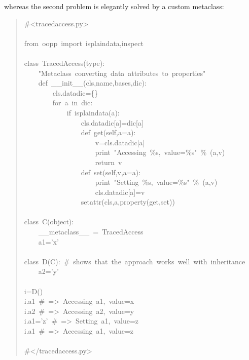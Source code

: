 \documentclass[10pt,english]{article}
\begin{document}
whereas the second problem is elegantly solved by a custom metaclass:
\begin{quote}
\begin{ttfamily}\begin{flushleft}
\mbox{{\#}<tracedaccess.py>}\\
\mbox{}\\
\mbox{from~oopp~import~isplaindata,inspect}\\
\mbox{}\\
\mbox{class~TracedAccess(type):}\\
\mbox{~~~~"Metaclass~converting~data~attributes~to~properties"}\\
\mbox{~~~~def~{\_}{\_}init{\_}{\_}(cls,name,bases,dic):}\\
\mbox{~~~~~~~~cls.datadic={\{}{\}}}\\
\mbox{~~~~~~~~for~a~in~dic:}\\
\mbox{~~~~~~~~~~~~if~isplaindata(a):}\\
\mbox{~~~~~~~~~~~~~~~~cls.datadic[a]=dic[a]}\\
\mbox{~~~~~~~~~~~~~~~~def~get(self,a=a):}\\
\mbox{~~~~~~~~~~~~~~~~~~~~v=cls.datadic[a]}\\
\mbox{~~~~~~~~~~~~~~~~~~~~print~"Accessing~{\%}s,~value={\%}s"~{\%}~(a,v)}\\
\mbox{~~~~~~~~~~~~~~~~~~~~return~v}\\
\mbox{~~~~~~~~~~~~~~~~def~set(self,v,a=a):}\\
\mbox{~~~~~~~~~~~~~~~~~~~~print~"Setting~{\%}s,~value={\%}s"~{\%}~(a,v)}\\
\mbox{~~~~~~~~~~~~~~~~~~~~cls.datadic[a]=v}\\
\mbox{~~~~~~~~~~~~~~~~setattr(cls,a,property(get,set))}\\
\mbox{}\\
\mbox{class~C(object):}\\
\mbox{~~~~{\_}{\_}metaclass{\_}{\_}~=~TracedAccess}\\
\mbox{~~~~a1='x'}\\
\mbox{}\\
\mbox{class~D(C):~{\#}~shows~that~the~approach~works~well~with~inheritance}\\
\mbox{~~~~a2='y'}\\
\mbox{}\\
\mbox{i=D()}\\
\mbox{i.a1~{\#}~=>~Accessing~a1,~value=x}\\
\mbox{i.a2~{\#}~=>~Accessing~a2,~value=y}\\
\mbox{i.a1='z'~{\#}~=>~Setting~a1,~value=z}\\
\mbox{i.a1~{\#}~=>~Accessing~a1,~value=z}\\
\mbox{}\\
\mbox{{\#}</tracedaccess.py>}
\end{flushleft}\end{ttfamily}
\end{quote}
\end{document}

